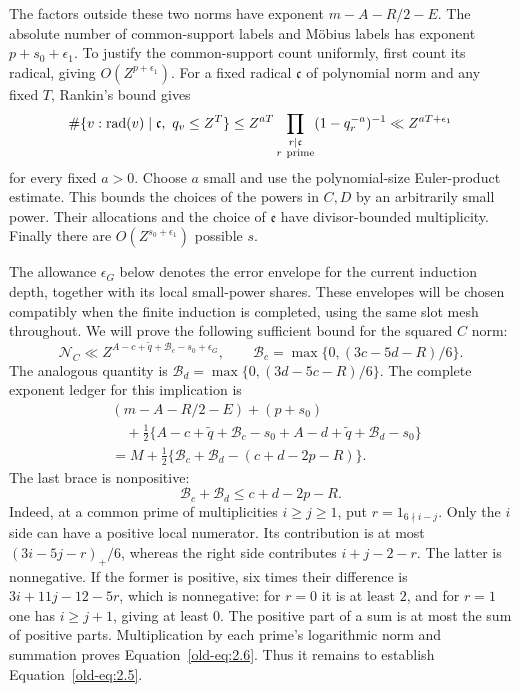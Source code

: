 \documentclass[12pt]{article}
\begin{document}
The factors outside these two norms have exponent
\(m-A-R/2-E\).  The absolute number of common-support labels and
M\"obius labels has exponent \(p+s_0+\epsilon_1\).  To justify
the common-support count uniformly, first count its radical, giving
\(O(Z^{p+\epsilon_1})\).  For a fixed radical \(\mathfrak c\) of
polynomial norm and any fixed \(T\), Rankin's bound gives
\[
 \#\{v:\operatorname{rad}(v)\mid\mathfrak c,\ q_v\le Z^T\}
 \le Z^{aT}\prod_{\substack{r\mid\mathfrak c\\r\ {\rm prime}}}
             (1-q_r^{-a})^{-1}
 \ll Z^{aT+\epsilon_1}
\]
for every fixed \(a>0\).  Choose \(a\) small and use the
polynomial-size Euler-product estimate.  This bounds the choices of
the powers in \(C,D\) by an arbitrarily small power.  Their
allocations and the choice of \(\mathfrak e\) have divisor-bounded
multiplicity.  Finally there are \(O(Z^{s_0+\epsilon_1})\)
possible \(s\).

The allowance \(\epsilon_G\) below denotes the error envelope for the
current induction depth, together with its local small-power shares.
These envelopes will be chosen compatibly when the finite induction is
completed, using the same slot mesh throughout.
We will prove the following sufficient bound for the squared \(C\)
norm:
\begin{equation}
 \mathcal N_C\ll
 Z^{A-c+\widetilde q+\mathcal B_c-s_0+\epsilon_G},
 \qquad
 \mathcal B_c=\max\{0,(3c-5d-R)/6\}.
 \label{old-eq:2.5}
\end{equation}
The analogous quantity is
\(\mathcal B_d=\max\{0,(3d-5c-R)/6\}\).
The complete exponent ledger for this implication is
\[
 \begin{aligned}
 &(m-A-R/2-E)+(p+s_0)\\
 &\quad+\tfrac12\{A-c+\widetilde q+\mathcal B_c-s_0
                  +A-d+\widetilde q+\mathcal B_d-s_0\}\\
 &=M+\tfrac12\{\mathcal B_c+\mathcal B_d-(c+d-2p-R)\}.
 \end{aligned}
\]
The last brace is nonpositive:
\begin{equation}
 \mathcal B_c+\mathcal B_d\le c+d-2p-R.
 \label{old-eq:2.6}
\end{equation}
Indeed, at a common prime of multiplicities \(i\ge j\ge1\), put
\(r=1_{6\nmid i-j}\).  Only the \(i\) side can have a positive
local numerator.  Its contribution is at most
\((3i-5j-r)_+/6\), whereas the right side contributes
\(i+j-2-r\).  The latter is nonnegative.  If the former is
positive, six times their difference is
\(3i+11j-12-5r\), which is nonnegative: for \(r=0\) it is at
least \(2\), and for \(r=1\) one has \(i\ge j+1\), giving at
least \(0\).  The positive part of a sum is at most the sum of
positive parts.  Multiplication by each prime's logarithmic norm
and summation proves Equation~\eqref{old-eq:2.6}.  Thus it remains
to establish Equation~\eqref{old-eq:2.5}.
\end{document}
